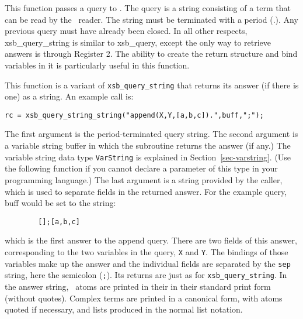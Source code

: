 \begin{description}
 
This function passes a query to \ourprolog .  The query is a string
consisting of a term that can be read by the \ourprolog\ reader.  The
string must be terminated with a period (.).  Any previous query must
have already been closed.  In all other respects, xsb\_query\_string
is similar to xsb\_query, except the only way to retrieve answers is
through Register 2.  The ability to create the return structure and
bind variables in it is particularly useful in this function.

  This function
is a variant of {\tt xsb\_query\_string} that returns its answer (if
there is one) as a string.  An example call is:
\begin{verbatim}
rc = xsb_query_string_string("append(X,Y,[a,b,c]).",buff,";");
\end{verbatim}
The first argument is the period-terminated query string.  The second
argument is a variable string buffer in which the subroutine returns the answer
(if any.) The variable string data type {\tt VarString}  is explained in
Section~\ref{sec-varstring}. (Use the following function if you cannot 
declare a parameter of this type in your programming language.)  
The last argument is a string
provided by the caller, which is used to separate fields in the returned
answer.  For the example query, buff would be set to the string:
\begin{verbatim}
        [];[a,b,c]
\end{verbatim}
which is the first answer to the append query.  There are two fields of
this answer, corresponding to the two variables in the query, \verb|X|
and \verb|Y|.  The bindings of those variables make up the answer and
the individual fields are separated by the \verb|sep| string, here the
semicolon (\verb|;|).  Its returns are
just as for {\tt xsb\_query\_string}.  In the answer string, \ourprolog\
atoms are printed in their in their standard print form (without
quotes).  Complex terms are printed in a canonical form, with atoms
quoted if necessary, and lists produced in the normal list notation.


\end{description}
